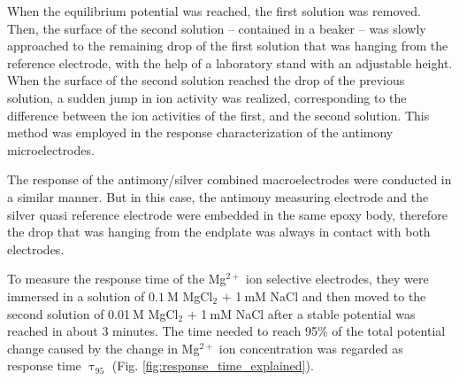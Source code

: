When the equilibrium potential was reached, the first solution was removed.
Then, the surface of the second solution -- contained in a beaker -- was slowly approached to the remaining drop of the first solution that was hanging from the reference electrode, with the help of a laboratory stand with an adjustable height.
When the surface of the second solution reached the drop of the previous solution, a sudden jump in ion activity was realized, corresponding to the difference between the ion activities of the first, and the second solution. This method was employed in the response characterization of the antimony microelectrodes.

The response of the antimony/silver combined macroelectrodes were conducted in a similar manner. But in this case, the antimony measuring electrode and the silver quasi reference electrode were embedded in the same epoxy body, therefore the drop that was hanging from the endplate was always in contact with both electrodes.

To measure the response time of the Mg$^{2+}$ ion selective electrodes, they were immersed in a solution of $0.1~$M MgCl$_2$ $+$ 1$~$mM NaCl and then moved to the second solution of 0.01$~$M MgCl$_2$ $+$ 1$~$mM NaCl after a stable potential was reached in about 3 minutes.
The time needed to reach 95\% of the total potential change caused by the change in Mg$^{2+}$ ion concentration was regarded as response time $\uptau_{95}$ (Fig. \ref{fig:response_time_explained}).

